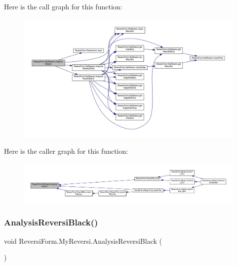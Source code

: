 Here is the call graph for this function\+:
\nopagebreak
\begin{figure}[H]
\begin{center}
\leavevmode
\includegraphics[width=350pt]{class_reversi_form_1_1_my_reversi_afc9513cbba4f973c7d1ee92e0a0f3288_cgraph}
\end{center}
\end{figure}
Here is the caller graph for this function\+:
\nopagebreak
\begin{figure}[H]
\begin{center}
\leavevmode
\includegraphics[width=350pt]{class_reversi_form_1_1_my_reversi_afc9513cbba4f973c7d1ee92e0a0f3288_icgraph}
\end{center}
\end{figure}
\mbox{\label{class_reversi_form_1_1_my_reversi_adfa9fda128ee816da9b32009326c5a15}} 
\subsubsection{\texorpdfstring{Analysis\+Reversi\+Black()}{AnalysisReversiBlack()}}
{\footnotesize\ttfamily void Reversi\+Form.\+My\+Reversi.\+Analysis\+Reversi\+Black (\begin{DoxyParamCaption}{ }\end{DoxyParamCaption})\hspace{0.3cm}{\ttfamily [private]}}



